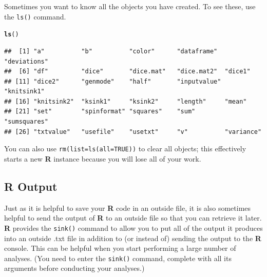 \documentclass[12pt]{article}\usepackage[]{graphicx}\usepackage[]{color}
\makeatletter
\newcommand{\hlstd}[1]{\textcolor[rgb]{0.345,0.345,0.345}{#1}}%
\newcommand{\hlkwd}[1]{\textcolor[rgb]{0.737,0.353,0.396}{\textbf{#1}}}%
\newenvironment{kframe}{%
 \def\at@end@of@kframe{}%
 \ifinner\ifhmode%
  \def\at@end@of@kframe{\end{minipage}}%
  \begin{minipage}{\columnwidth}%
 \fi\fi%
 \def\FrameCommand##1{\hskip\@totalleftmargin \hskip-\fboxsep
 \colorbox{shadecolor}{##1}\hskip-\fboxsep
     \hskip-\linewidth \hskip-\@totalleftmargin \hskip\columnwidth}%
 \MakeFramed {\advance\hsize-\width
   \@totalleftmargin\z@ \linewidth\hsize
   \@setminipage}}%
 {\par\unskip\endMakeFramed%
 \at@end@of@kframe}
\newenvironment{knitrout}{}{} %
\makeatother
\begin{document}
Sometimes you want to know all the objects you have created. To see these, use the \verb|ls()| command.
\begin{knitrout}
\color{fgcolor}\begin{kframe}
\begin{alltt}
\hlkwd{ls}\hlstd{()}
\end{alltt}
\begin{verbatim}
##  [1] "a"          "b"          "color"      "dataframe"  "deviations"
##  [6] "df"         "dice"       "dice.mat"   "dice.mat2"  "dice1"     
## [11] "dice2"      "genmode"    "half"       "inputvalue" "knitsink1" 
## [16] "knitsink2"  "ksink1"     "ksink2"     "length"     "mean"      
## [21] "set"        "spinformat" "squares"    "sum"        "sumsquares"
## [26] "txtvalue"   "usefile"    "usetxt"     "v"          "variance"
\end{verbatim}
\end{kframe}
\end{knitrout}

You can also use \verb|rm(list=ls(all=TRUE))| to clear all objects; this effectively starts a new \textbf{R} instance because you will lose all of your work.

\subsection{\textbf{R} Output}
Just as it is helpful to save your \textbf{R} code in an outside file, it is also sometimes helpful to send the output of \textbf{R} to an outside file so that you can retrieve it later. \textbf{R} provides the \verb|sink()| command to allow you to put all of the output it produces into an outside .txt file in addition to (or instead of) sending the output to the \textbf{R} console. This can be helpful when you start performing a large number of analyses. (You need to enter the \verb|sink()| command, complete with all its arguments before conducting your analyses.)
\end{document}
